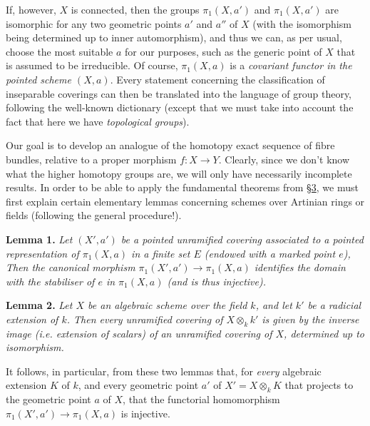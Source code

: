 \documentclass{article}
\newenvironment{itenv}[1]
  {\phantomsection\par\medskip\noindent\textbf{#1.}\itshape}
  {\medskip}
\newcommand{\oldpage}[1]{\marginpar{\footnotesize$\Big\vert$ \textit{p.~#1}}}
\begin{document}
If, however, $X$ is connected, then the groups $\pi_1(X,a')$ and $\pi_1(X,a')$ are isomorphic for any two geometric points $a'$ and $a''$ of $X$ (with the isomorphism being determined up to inner automorphism), and thus we can, as per usual, choose the most suitable $a$ for our purposes, such as the generic point of
\oldpage{182-19}
$X$ that is assumed to be irreducible.
Of course, $\pi_1(X,a)$ is a \emph{covariant functor in the pointed scheme $(X,a)$}.
Every statement concerning the classification of inseparable coverings can then be translated into the language of group theory, following the well-known dictionary (except that we must take into account the fact that here we have \emph{topological groups}).

Our goal is to develop an analogue of the homotopy exact sequence of fibre bundles, relative to a proper morphism $f\colon X\to Y$.
Clearly, since we don't know what the higher homotopy groups are, we will only have necessarily incomplete results.
In order to be able to apply the fundamental theorems from \hyperref[section3]{\S3}, we must first explain certain elementary lemmas concerning schemes over Artinian rings or fields (following the general procedure!).

\begin{itenv}{Lemma 1}
\label{lemma1}
  Let $(X',a')$ be a pointed unramified covering associated to a pointed representation of $\pi_1(X,a)$ in a finite set $E$ (endowed with a marked point $e$),
  Then the canonical morphism $\pi_1(X',a')\to\pi_1(X,a)$ identifies the domain with the stabiliser of $e$ in $\pi_1(X,a)$ (and is thus injective).
\end{itenv}

\begin{itenv}{Lemma 2}
\label{lemma2}
  Let $X$ be an algebraic scheme over the field $k$, and let $k'$ be a radicial extension of $k$.
  Then every unramified covering of $X\otimes_kk'$ is given by the inverse image (i.e. extension of scalars) of an unramified covering of $X$, determined up to isomorphism.
\end{itenv}

It follows, in particular, from these two lemmas that, for \emph{every} algebraic extension $K$ of $k$, and every geometric point $a'$ of $X'=X\otimes_kK$ that projects to the geometric point $a$ of $X$, that the functorial homomorphism $\pi_1(X',a')\to\pi_1(X,a)$ is injective.
\end{document}
